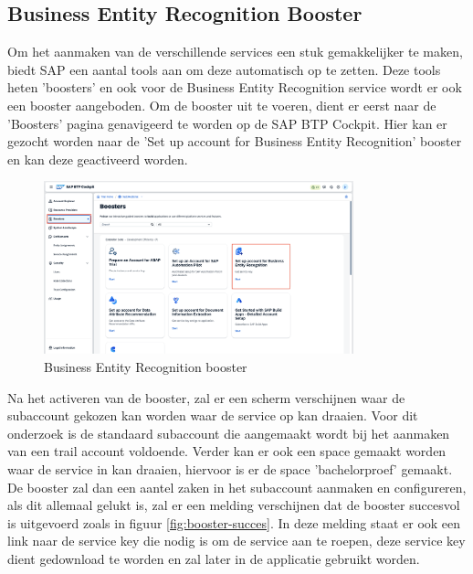 \subsection{Business Entity Recognition Booster}
\label{sec:ber-booster}
Om het aanmaken van de verschillende services een stuk gemakkelijker te maken, biedt SAP een aantal tools aan om deze automatisch op te zetten. Deze tools heten 'boosters' en ook voor de Business Entity Recognition service wordt er ook een booster aangeboden. Om de booster uit te voeren, dient er eerst naar de 'Boosters' pagina genavigeerd te worden op de SAP BTP Cockpit. Hier kan er gezocht worden naar de 'Set up account for Business Entity Recognition' booster en kan deze geactiveerd worden. 
\begin{figure}[H]
    \centering
    \includegraphics[width=0.8\textwidth]{./graphics/sap_btp_home_boosters.png}
    \caption{Business Entity Recognition booster}
    \label{fig:ber-booster}
\end{figure}

Na het activeren van de booster, zal er een scherm verschijnen waar de subaccount gekozen kan worden waar de service op kan draaien. Voor dit onderzoek is de standaard subaccount die aangemaakt wordt bij het aanmaken van een trail account voldoende. Verder kan er ook een space gemaakt worden waar de service in kan draaien, hiervoor is er de space 'bachelorproef' gemaakt. De booster zal dan een aantel zaken in het subaccount aanmaken en configureren, als dit allemaal gelukt is, zal er een melding verschijnen dat de booster succesvol is uitgevoerd zoals in figuur \ref{fig:booster-succes}. In deze melding staat er ook een link naar de service key die nodig is om de service aan te roepen, deze service key dient gedownload te worden en zal later in de applicatie gebruikt worden.


